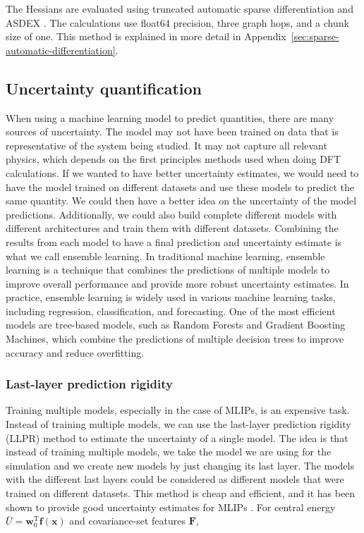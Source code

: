 \documentclass[12pt,a4paper]{article}
\numberwithin{equation}{section}
\begin{document}
The Hessians are evaluated using truncated
automatic sparse differentiation \cite{sadmof} and ASDEX \cite{asdex}.
The calculations use float64 precision, three graph hops, and a
chunk size of one. This method is explained in more detail in Appendix~\ref{sec:sparse-automatic-differentiation}.

\subsection{Uncertainty quantification}
\label{sec:uq}

When using a machine learning model to predict quantities, there are many sources of uncertainty.
The model may not have been trained on data that is representative of the system being studied.
It may not capture all relevant physics, which depends on the first principles methods used when doing DFT calculations.
If we wanted to have better uncertainty estimates, we would need to have the model trained on different datasets and use these models to predict the same quantity.
We could then have a better idea on the uncertainty of the model predictions.
Additionally, we could also build complete different models with different architectures and train them with different datasets.
Combining the results from each model to have a final prediction and uncertainty estimate is what we call ensemble learning.
In traditional machine learning, ensemble learning is a technique that combines the predictions of multiple models to improve overall performance and provide more robust uncertainty estimates.
In practice, ensemble learning is widely used in various machine learning tasks, including regression, classification, and forecasting.
One of the most efficient models are tree-based models, such as Random Forests and Gradient Boosting Machines, which combine the predictions of multiple decision trees to improve accuracy and reduce overfitting.

\subsubsection{Last-layer prediction rigidity}

Training multiple models, especially in the case of MLIPs, is an expensive task.
Instead of training multiple models,
we can use the last-layer prediction rigidity (LLPR) \cite{bigi2024} method to estimate the uncertainty of a single model.
The idea is that instead of training multiple models,
we take the model we are using for the simulation and we create new models by just changing its last layer.
The models with the different last layers could be considered as different models that were trained on different datasets.
This method is cheap and efficient, and it has been shown to provide good uncertainty estimates for MLIPs \cite{bigi2024}.
For central energy $\bar U=\bm w_0^{\mathrm T}\bm f(\bm x)$ and covariance-set features $\bm F$,
\end{document}
